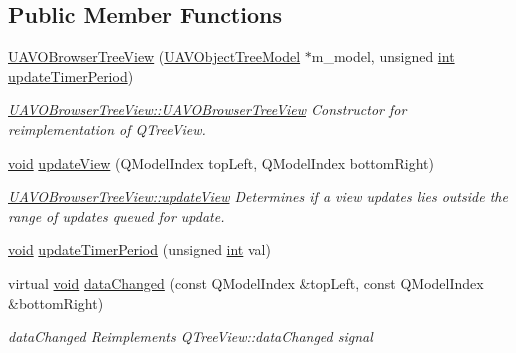 \subsection*{Public Member Functions}
\begin{DoxyCompactItemize}
\item 
\hyperlink{group___u_a_v_object_browser_plugin_gac8e16cfc29870fb1f96574c5e0a99f13}{U\-A\-V\-O\-Browser\-Tree\-View} (\hyperlink{class_u_a_v_object_tree_model}{U\-A\-V\-Object\-Tree\-Model} $\ast$m\-\_\-model, unsigned \hyperlink{ioapi_8h_a787fa3cf048117ba7123753c1e74fcd6}{int} \hyperlink{group___u_a_v_object_browser_plugin_ga9a903a75f0eb4f7b88c87dc948d8f63a}{update\-Timer\-Period})
\begin{DoxyCompactList}\small\item\em \hyperlink{group___u_a_v_object_browser_plugin_gac8e16cfc29870fb1f96574c5e0a99f13}{U\-A\-V\-O\-Browser\-Tree\-View\-::\-U\-A\-V\-O\-Browser\-Tree\-View} Constructor for reimplementation of Q\-Tree\-View. \end{DoxyCompactList}\item 
\hyperlink{group___u_a_v_objects_plugin_ga444cf2ff3f0ecbe028adce838d373f5c}{void} \hyperlink{group___u_a_v_object_browser_plugin_ga39a127a4af34e1ea92aca8448ee5e92f}{update\-View} (Q\-Model\-Index top\-Left, Q\-Model\-Index bottom\-Right)
\begin{DoxyCompactList}\small\item\em \hyperlink{group___u_a_v_object_browser_plugin_ga39a127a4af34e1ea92aca8448ee5e92f}{U\-A\-V\-O\-Browser\-Tree\-View\-::update\-View} Determines if a view updates lies outside the range of updates queued for update. \end{DoxyCompactList}\item 
\hyperlink{group___u_a_v_objects_plugin_ga444cf2ff3f0ecbe028adce838d373f5c}{void} \hyperlink{group___u_a_v_object_browser_plugin_ga9a903a75f0eb4f7b88c87dc948d8f63a}{update\-Timer\-Period} (unsigned \hyperlink{ioapi_8h_a787fa3cf048117ba7123753c1e74fcd6}{int} val)
\item 
virtual \hyperlink{group___u_a_v_objects_plugin_ga444cf2ff3f0ecbe028adce838d373f5c}{void} \hyperlink{group___u_a_v_object_browser_plugin_ga854dce00ee3378eb2fc1414eaaaf2a00}{data\-Changed} (const Q\-Model\-Index \&top\-Left, const Q\-Model\-Index \&bottom\-Right)
\begin{DoxyCompactList}\small\item\em data\-Changed Reimplements Q\-Tree\-View\-::data\-Changed signal \end{DoxyCompactList}\end{DoxyCompactItemize}



